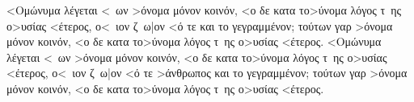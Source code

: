 \documentclass[12pt,a4paper]{book}
\begin{document}
\def\toto#1{\edef\s{\detokenize{#1}}}
\toto{μόνον}
\beginnumbering
{}
 \pstart <Ομώνυμα λέγεται <~ων >όνομα μόνον κοινόν, <ο δε κατα το>ύνομα λόγος τ~ης ο>υσίας <έτερος, ο<~ιον ζ~ω|ον <ό τε  και το γεγραμμένον; τούτων γαρ >όνομα μόνον κοινόν, <ο δε κατα το>ύνομα λόγος τ~ης ο>υσίας <έτερος. <Ομώνυμα λέγεται <~ων >όνομα μόνον κοινόν, <ο δε κατα το>ύνομα λόγος τ~ης ο>υσίας <έτερος, ο<~ιον ζ~ω|ον <ό τε >άνθρωπος και το γεγραμμένον; τούτων γαρ >όνομα μόνον κοινόν, <ο δε κατα το>ύνομα λόγος τ~ης ο>υσίας <έτερος. \pend 
\endnumbering


\printindex
\end{document}

